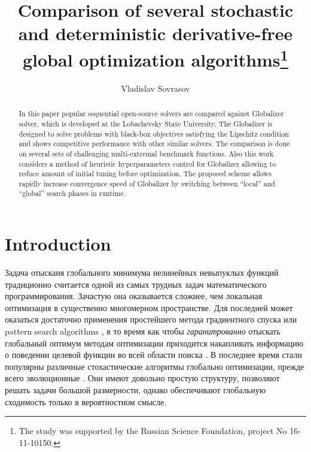\documentclass[runningheads]{llncs}
\begin{document}
%
\title{Comparison of several stochastic and deterministic derivative-free global optimization algorithms\thanks{The study was supported by the Russian Science Foundation, project No 16-11-10150.}}
%
%
\author{Vladislav Sovrasov}
%
%
%
\maketitle              %
%

\begin{abstract}
In this paper popular sequential open-source solvers are compared against
Globalizer solver, which is developed at the Lobachevsky State University.
The Globalizer is designed to solve problems with black-box objectives satisfying the Lipschitz condition and shows
competitive performance with other similar solvers. The comparison is done on several sets of
challenging multi-extremal benchmark functions. Also this work considers a method of
heuristic hyperparameters control for Globalizer allowing to reduce amount of
initial tuning before optimization. The proposed scheme allows rapidly increase convergence speed
of Globalizer by switching between ``local'' and ``global'' search phases in runtime.
\end{abstract}
%
\section{Introduction}

Задача отысканя глобального минимума нелинейных невыпуклых функций традиционно считается одной из самых трудных
задач математического программирования. Зачастую она оказывается сложнее, чем локальная оптимизация в существенно многомерном пространстве.
Для последней может оказаться достаточно применения простейшего метода градиентного спуска или pattern search algorithms \cite{torczon1997},
в то время как чтобы \textit{гаранитрованно} отыскать глобальный оптимум методам
оптимизации приходится накапливать информацию о поведении целевой функции во всей области поиска \cite{Jones2009,Paulavicius2011,Evtushenko2013,strSergGO}. В последнее время стали популярны
различные стохастические алгоритмы глобально оптимизации, прежде всего эволюционные \cite{Storn1997, SCHLUTER2009, KennedyEberhart1995}. Они имеют довольно простую структуру, позволяют решать задачи большой размерности, однако обеспечивают глобальную сходимость только в вероятностном смысле.
\end{document}
